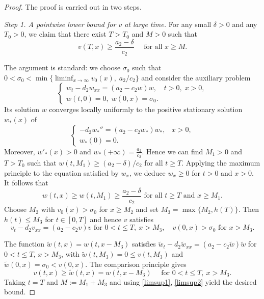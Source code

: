 \documentclass[reqno]{amsart}
\theoremstyle{plain}
\theoremstyle{definition}
\theoremstyle{remark}
\begin{document}
	\begin{proof}
		The proof is carried out in two steps.
		
		\textit{Step 1.  A pointwise lower bound for \(v\) at large time.}  
		For any small \(\delta>0\) and any \(T_0>0\), we claim that there exist \(T>T_0\) and \(M>0\) such that
		\[
		v(T,x) \ge \frac{a_2-\delta}{c_2}\quad\text{ for all } x\ge M.
		\]
		
		The argument is standard: we choose $\sigma_0$ such that \(0<\sigma_0<\min\bigl\{\liminf_{x\to\infty}v_0(x),\; a_2/c_2\bigr\}\) and consider the auxiliary problem
		\[
		\begin{cases}
			w_t-d_2w_{xx}=(a_2-c_2w)w, & t>0,\;x>0,\\
			w(t,0)=0,\; w(0,x)=\sigma_0.
		\end{cases}
		\]
		Its solution $w$ converges locally uniformly to the positive stationary solution \(w_*(x)\) of 
		\[
		\begin{cases}
			-d_2w_*''=(a_2-c_2w_*)w_*, & x>0,\\
			w_*(0)=0.
		\end{cases}
		\]
		Moreover, $w'_*(x) > 0$ and $w_*(+\infty) = \frac{a_2}{c_2}$. Hence we can find \(M_1>0\) and \(T>T_0\) such that \(w(t,M_1)\ge (a_2-\delta)/c_2\) for all $t \geq T$.
		Applying the maximum principle to the equation satisfied by $w_x$, we deduce $w_x \ge 0$ for $t >0$ and $x>0$. It follows that
		\begin{equation}\label{limsup1}
			w(t,x) \geq w(t,M_1)\ge \frac{a_2 - \delta}{c_2} \text{ for all } t  \geq T \text{ and } x \geq M_1.
		\end{equation}
		Choose \(M_2\) with \(v_0(x)>\sigma_0\) for \(x\ge M_2\) and set \(M_3=\max\{M_2,h(T)\}\).  Then \(h(t)\le M_3\) for \(t\in[0,T]\) and hence $v$ satisfies
		\[
		v_t - d_2v_{xx} = (a_2 - c_2v)v \text{ for } 0 < t \leq T, ~ x > M_3, \quad v(0,x) > \sigma_0 \text{ for } x > M_3.	
		\]
		
		The function \(\tilde w(t,x)=w(t,x-M_3)\) satisfies \(\tilde w_t-d_2\tilde w_{xx}=(a_2-c_2\tilde w)\tilde w\) for \(0<t\le T\), \(x>M_3\), with \(\tilde w(t,M_3)=0\le v(t,M_3)\) and \(\tilde w(0,x)=\sigma_0<v(0,x)\).  The comparison principle gives
		\begin{equation}\label{limsup2}
			v(t, x) \geq \tilde{w}(t, x) = w(t, x - M_3) \quad \text{ for } 0 < t \leq T, ~ x > M_3.
		\end{equation}
		Taking \(t=T\) and \(M:=M_1+M_3\) and using \eqref{limsup1}, \eqref{limsup2} yield the desired bound.
		

\end{proof}
\end{document}
